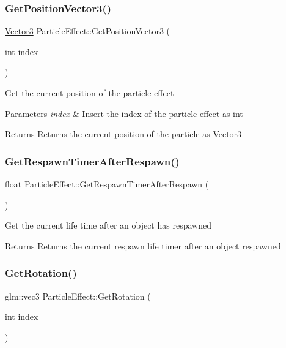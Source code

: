 \subsubsection{\texorpdfstring{GetPositionVector3()}{GetPositionVector3()}}
{\footnotesize\ttfamily \mbox{\hyperlink{struct_vector3}{Vector3}} Particle\+Effect\+::\+Get\+Position\+Vector3 (\begin{DoxyParamCaption}\item[{int}]{index }\end{DoxyParamCaption})}

Get the current position of the particle effect 
\begin{DoxyParams}{Parameters}
{\em index} & Insert the index of the particle effect as int \\
\hline
\end{DoxyParams}
\begin{DoxyReturn}{Returns}
Returns the current position of the particle as \mbox{\hyperlink{struct_vector3}{Vector3}} 
\end{DoxyReturn}
\mbox{\label{class_particle_effect_ae62bebdcffc8d6154a919601dd60e880}} 
\subsubsection{\texorpdfstring{GetRespawnTimerAfterRespawn()}{GetRespawnTimerAfterRespawn()}}
{\footnotesize\ttfamily float Particle\+Effect\+::\+Get\+Respawn\+Timer\+After\+Respawn (\begin{DoxyParamCaption}{ }\end{DoxyParamCaption})}

Get the current life time after an object has respawned \begin{DoxyReturn}{Returns}
Returns the current respawn life timer after an object respawned 
\end{DoxyReturn}
\mbox{\label{class_particle_effect_a2a20f8db2c022ed139eb236bd10b470d}} 
\subsubsection{\texorpdfstring{GetRotation()}{GetRotation()}}
{\footnotesize\ttfamily glm\+::vec3 Particle\+Effect\+::\+Get\+Rotation (\begin{DoxyParamCaption}\item[{int}]{index }\end{DoxyParamCaption})}

